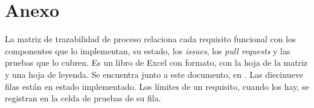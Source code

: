 \section{Anexo}
\label{sec:matriz-trazabilidad}

La matriz de trazabilidad de proceso relaciona cada requisito funcional con los componentes que lo implementan, su estado, los \textit{issues}, los \textit{pull requests} y las pruebas que lo cubren. Es un libro de Excel con formato, con la hoja de la matriz y una hoja de leyenda. Se encuentra junto a este documento, en . Las diecinueve filas están en estado implementado. Los límites de un requisito, cuando los hay, se registran en la celda de pruebas de su fila.
